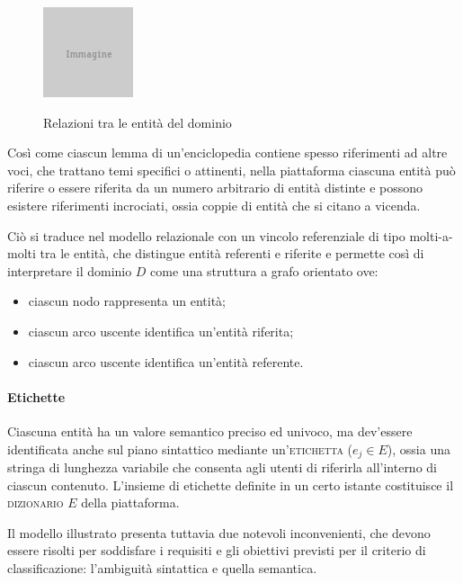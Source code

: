 \begin{figure}[ht]
	\begin{center}
		\includegraphics{placeholder.png}
		\label{fig:tesi:stage:fase-uno:entita-relazioni}
		\caption{Relazioni tra le entità del dominio}
	\end{center}
\end{figure}

Così come ciascun lemma di un'enciclopedia contiene spesso riferimenti ad altre voci, che trattano temi specifici o attinenti, nella piattaforma ciascuna entità può riferire o essere riferita da un numero arbitrario di entità distinte e possono esistere riferimenti incrociati, ossia coppie di entità che si citano a vicenda.

Ciò si traduce nel modello relazionale con un vincolo referenziale di tipo molti-a-molti tra le entità, che distingue entità referenti e riferite e permette così di interpretare il dominio $D$ come una struttura a grafo orientato ove:
\begin{itemize}
\item ciascun nodo rappresenta un entità;
\item ciascun arco uscente identifica un'entità riferita;
\item ciascun arco uscente identifica un'entità referente.
\end{itemize}

\paragraph{Etichette}
Ciascuna entità ha un valore semantico preciso ed univoco, ma dev'essere identificata anche sul piano sintattico mediante un'\textsc{etichetta} ($e_j \in E$), ossia una stringa di lunghezza variabile che consenta agli utenti di riferirla all'interno di ciascun contenuto. L'insieme di etichette definite in un certo istante costituisce il \textsc{dizionario} $E$ della piattaforma.

Il modello illustrato presenta tuttavia due notevoli inconvenienti, che devono essere risolti per soddisfare i requisiti e gli obiettivi previsti per il criterio di classificazione: l'ambiguità sintattica e quella semantica.

